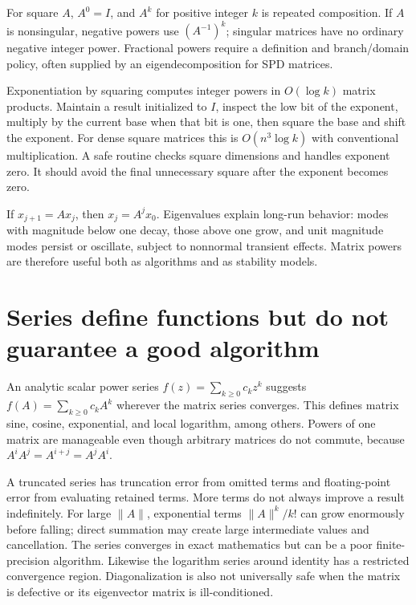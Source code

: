 \hypertarget{02-foundations-ii-ch026-matrix-powers-range-from-repeated-action-to-fractional-functions}{}

For square \(A\), \(A^0=I\), and \(A^k\) for positive integer \(k\) is repeated composition. If \(A\) is nonsingular, negative powers use \((A^{-1})^k\); singular matrices have no ordinary negative integer power. Fractional powers require a definition and branch/domain policy, often supplied by an eigendecomposition for SPD matrices.

Exponentiation by squaring computes integer powers in \(O(\log k)\) matrix products. Maintain a result initialized to \(I\), inspect the low bit of the exponent, multiply by the current base when that bit is one, then square the base and shift the exponent. For dense square matrices this is \(O(n^3\log k)\) with conventional multiplication. A safe routine checks square dimensions and handles exponent zero. It should avoid the final unnecessary square after the exponent becomes zero.

If \(x_{j+1}=Ax_j\), then \(x_j=A^jx_0\). Eigenvalues explain long-run behavior: modes with magnitude below one decay, those above one grow, and unit magnitude modes persist or oscillate, subject to nonnormal transient effects. Matrix powers are therefore useful both as algorithms and as stability models.

\section{Series define functions but do not guarantee a good algorithm}\label{02-foundations-ii-ch026-series-define-functions-but-do-not-guarantee-a-good-algorithm}

\hypertarget{02-foundations-ii-ch026-series-define-functions-but-do-not-guarantee-a-good-algorithm}{}

An analytic scalar power series \(f(z)=\sum_{k\ge0}c_kz^k\) suggests \(f(A)=\sum_{k\ge0}c_kA^k\) wherever the matrix series converges. This defines matrix sine, cosine, exponential, and local logarithm, among others. Powers of one matrix are manageable even though arbitrary matrices do not commute, because \(A^iA^j=A^{i+j}=A^jA^i\).

A truncated series has truncation error from omitted terms and floating-point error from evaluating retained terms. More terms do not always improve a result indefinitely. For large \(\|A\|\), exponential terms \(\|A\|^k/k!\) can grow enormously before falling; direct summation may create large intermediate values and cancellation. The series converges in exact mathematics but can be a poor finite-precision algorithm. Likewise the logarithm series around identity has a restricted convergence region. Diagonalization is also not universally safe when the matrix is defective or its eigenvector matrix is ill-conditioned.

